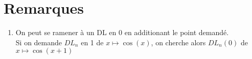 \documentclass[fleqn]{article}
\theoremstyle{definition} \newtheorem*{defi}{D\'efinition}
\theoremstyle{definition} \newtheorem*{theo}{Th\'eor\`eme}
\theoremstyle{definition} \newtheorem*{prop}{Propri\'et\'e}
\theoremstyle{definition} \newtheorem*{coro}{Corollaire}
\theoremstyle{remark} \newtheorem*{rqs}{Remarques}
\begin{document}
\section{Remarques}
\begin{enumerate}
	\item On peut se ramener \`a un DL en $0$ en additionant le point demand\'e. \\
	Si on demande $DL_n$ en 1 de $x \mapsto \cos(x)$, on cherche alors $DL_n(0)$ de $x \mapsto \cos(x+1)$
\end{enumerate}
\end{document}
